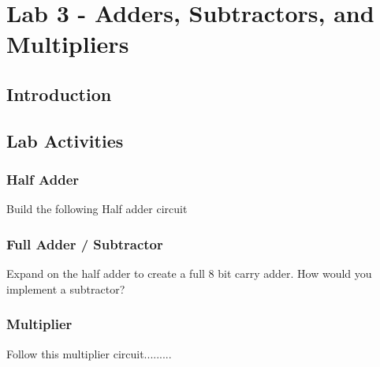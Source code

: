 \section{Lab 3 - Adders, Subtractors, and Multipliers}

\subsection{Introduction}

\subsection{Lab Activities}

\subsubsection{Half Adder}
Build the following Half adder circuit

\subsubsection{Full Adder / Subtractor}
Expand on the half adder to create a full 8 bit carry adder. How would you implement a subtractor?

\subsubsection{Multiplier}
Follow this multiplier circuit.........










